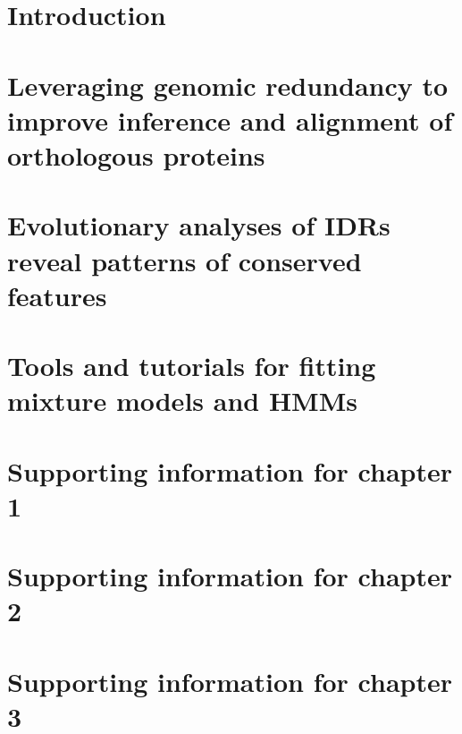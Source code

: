 \documentclass[11pt,letterpaper,oneside]{book}
\renewcommand{\thefigure}{\thechapter.\arabic{figure}}
\newlength{\promptwidth}
\begin{document}
\tableofcontents
\clearpage  %
\setcounter{chapter}{-1}  %
\setcounter{page}{1}  %

\chapter{Introduction}
\label{chapter:0}
\graphicspath{{chapter0/figures/}}


\chapter{Leveraging genomic redundancy to improve inference and alignment of orthologous proteins}
\label{chapter:1}
\graphicspath{{chapter1/figures/}}


\chapter{Evolutionary analyses of IDRs reveal patterns of conserved features}
\label{chapter:2}
\graphicspath{{chapter2/figures/}}


\chapter{Tools and tutorials for fitting mixture models and HMMs}
\label{chapter:3}
\graphicspath{{chapter3/}}



\printbibliography[heading=bibintoc, title=References]  %

\appendix
\setcounter{figure}{0}
\renewcommand{\thefigure}{\thechapter\arabic{figure}}
\setcounter{table}{0}
\renewcommand{\thetable}{\thechapter\arabic{table}}

\chapter{Supporting information for chapter 1}
\label{appendix:a}
\graphicspath{{chapter1/figures/}}


\chapter{Supporting information for chapter 2}
\label{appendix:b}
\graphicspath{{chapter2/figures/}}


\chapter{Supporting information for chapter 3}
\label{appendix:c}
\setlength{\promptwidth}{0in}  %

\end{document}
